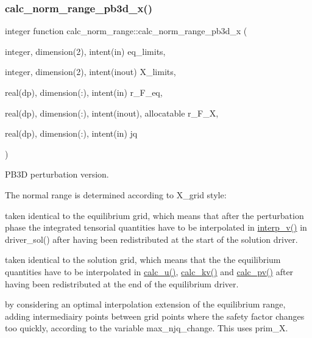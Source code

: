 \subsubsection{\texorpdfstring{calc\+\_\+norm\+\_\+range\+\_\+pb3d\+\_\+x()}{calc\_norm\_range\_pb3d\_x()}}
{\footnotesize\ttfamily integer function calc\+\_\+norm\+\_\+range\+::calc\+\_\+norm\+\_\+range\+\_\+pb3d\+\_\+x (\begin{DoxyParamCaption}\item[{integer, dimension(2), intent(in)}]{eq\+\_\+limits,  }\item[{integer, dimension(2), intent(inout)}]{X\+\_\+limits,  }\item[{real(dp), dimension(\+:), intent(in)}]{r\+\_\+\+F\+\_\+eq,  }\item[{real(dp), dimension(\+:), intent(inout), allocatable}]{r\+\_\+\+F\+\_\+X,  }\item[{real(dp), dimension(\+:), intent(in)}]{jq }\end{DoxyParamCaption})}



P\+B3D perturbation version. 

The normal range is determined according to X\+\_\+grid style\+:
\begin{DoxyEnumerate}
\item taken identical to the equilibrium grid, which means that after the perturbation phase the integrated tensorial quantities have to be interpolated in \hyperlink{namespacedriver__sol_af1c4ea0286ad714d3f91bb1608e4fc27}{interp\+\_\+v()} in driver\+\_\+sol() after having been redistributed at the start of the solution driver.
\item taken identical to the solution grid, which means that the the equilibrium quantities have to be interpolated in \hyperlink{namespacex__ops_a4e39701da15ff952add5133db1897b52}{calc\+\_\+u()}, \hyperlink{namespacex__ops_a045e8903230dfa0fb8b89b458d0c8ee2}{calc\+\_\+kv()} and \hyperlink{namespacex__ops_a51f3bf0b4c8d688ffbcc3a1adbca9762}{calc\+\_\+pv()} after having been redistributed at the end of the equilibrium driver.
\item by considering an optimal interpolation extension of the equilibrium range, adding intermediairy points between grid points where the safety factor changes too quickly, according to the variable \textquotesingle{}max\+\_\+njq\+\_\+change\textquotesingle{}. This uses {\ttfamily prim\+\_\+X}.
\end{DoxyEnumerate}


